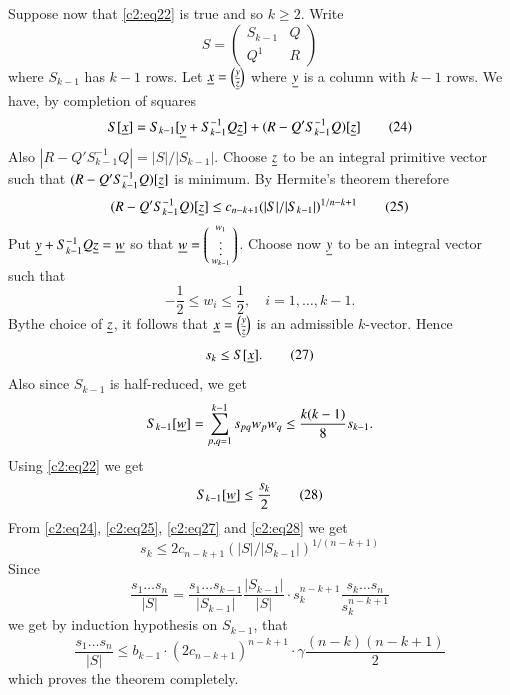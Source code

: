 Suppose now that \eqref{c2:eq22} is true and so $k\geq 2$. Write
$$
S=
\begin{pmatrix}
S_{k-1} & Q\\
Q^{1} & R
\end{pmatrix}
$$
where $S_{k-1}$ has $k-1$ rows. Let $\underline{x}=\binom{\underline{y}}{\underline{z}}$
where $\underline{y}$ is a column with $k-1$ rows. We have, by completion of
squares
\begin{equation*}
S[\underline{x}]=S_{k-1}[\underline{y}+S^{-1}_{k-1}Q\underline{z}]+(R-Q'S^{-1}_{k-1}Q)[\underline{z}]\tag{24}\label{c2:eq24} 
\end{equation*}
Also $|R-Q'S^{-1}_{k-1}Q|=|S|/|S_{k-1}|$. Choose $\underline{z}$ to be an
integral primitive vector such that $(R-Q'S^{-1}_{k-1}Q)[\underline{z}]$ is
minimum. By Hermite's theorem therefore
\begin{equation*}
(R-Q'S^{-1}_{k-1}Q)[\underline{z}]\leq
  c_{n-k+1}(|S|/|S_{k-1}|)^{1/n-k+1}\tag{25}\label{c2:eq25} 
\end{equation*}
Put $\underline{y}+S^{-1}_{k-1}Q\underline{z}=\underline{w}$ so that
$\underline{w}=\left(\begin{smallmatrix}w_{1}\\ \vdots\\ w_{k-1}
\end{smallmatrix}\right)$. Choose now $\underline{y}$ to be an integral
vector such that
\begin{equation*}
-\frac{1}{2}\leq w_{i}\leq \frac{1}{2},\quad
i=1,\ldots,k-1.\tag{26}\label{c2:eq26} 
\end{equation*}
By\pageoriginale the choice of $\underline{z}$, it follows that
$\underline{x}=\binom{\underline{y}}{\underline{z}}$ is an admissible $k$-vector. Hence
\begin{equation*}
s_{k}\leq S[\underline{x}].\tag{27}\label{c2:eq27}
\end{equation*}
Also since $S_{k-1}$ is half-reduced, we get
$$
S_{k-1}[\underline{w}]=\sum^{k-1}_{p,q=1}s_{pq}w_{p}w_{q}\leq
\frac{k(k-1)}{8}s_{k-1}. 
$$
Using \eqref{c2:eq22} we get
\begin{equation*}
S_{k-1}[\underline{w}]\leq \frac{s_{k}}{2}\tag{28}\label{c2:eq28}
\end{equation*}
From \eqref{c2:eq24}, \eqref{c2:eq25}, \eqref{c2:eq27} and \eqref{c2:eq28} we get
\begin{equation*}
s_{k}\leq 2 c_{n-k+1}(|S|/|S_{k-1}|)^{1/(n-k+1)}\tag{29}\label{c2:eq29}
\end{equation*}
Since 
$$
\frac{s_{1}\ldots s_{n}}{|S|}=\frac{s_{1}\ldots
  s_{k-1}}{|S_{k-1}|}\frac{|S_{k-1}|}{|S|}\cdot
s^{n-k+1}_{k}\frac{s_{k}\ldots s_{n}}{s^{n-k+1}_{k}}
$$
we get by induction hypothesis on $S_{k-1}$, that
$$
\frac{s_{1}\ldots s_{n}}{|S|}\leq b_{k-1}\cdot
(2c_{n-k+1})^{n-k+1}\cdot \gamma\frac{(n-k)(n-k+1)}{2} 
$$
which proves the theorem completely.

